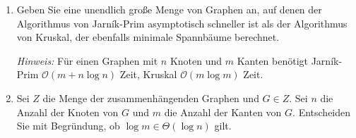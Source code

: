 \documentclass{bschlangaul-aufgabe}
\begin{document}
\begin{enumerate}
\begin{liAntwort}
\begin{multicols}{2}


\end{multicols}
\end{liAntwort}


\item Geben Sie eine unendlich große Menge von Graphen an, auf denen der
Algorithmus von Jarník-Prim asymptotisch schneller ist als der
Algorithmus von Kruskal, der ebenfalls minimale Spannbäume berechnet.

\emph{Hinweis:} Für einen Graphen mit $n$ Knoten und $m$ Kanten benötigt
Jarník-Prim $\mathcal{O}(m + n \log n)$ Zeit, Kruskal $\mathcal{O}(m
\log m)$ Zeit.


\item Sei $Z$ die Menge der zusammenhängenden Graphen und $G \in Z$. Sei
$n$ die Anzahl der Knoten von $G$ und $m$ die Anzahl der Kanten von $G$.
Entscheiden Sie mit Begründung, ob $\log m \in \Theta(\log n)$ gilt.

\end{enumerate}
\end{document}
